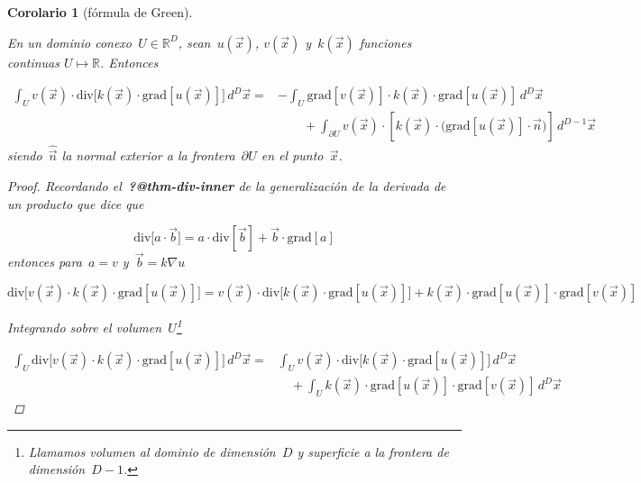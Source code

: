 \documentclass[
  12pt,
  a4paper,
  table]{scrbook}
\theoremstyle{plain}
\theoremstyle{definition}
\theoremstyle{plain}
\theoremstyle{plain}
\newtheorem{corollary}{Corolario}[chapter]
\theoremstyle{remark}
\begin{document}
\begin{corollary}[fórmula de
Green]\protect\hypertarget{cor-green}{}\label{cor-green}

En un dominio conexo~\(U \in \mathbb{R}^D\), sean~\(u(\vec{x})\),
\(v(\vec{x})\) y~\(k(\vec{x})\) funciones continuas
\(U \mapsto \mathbb{R}\). Entonces

\[
\begin{aligned}
\int_U v(\vec{x}) \cdot \mathrm{div} \Big[ k(\vec{x}) \cdot \mathrm{grad} \left[ u(\vec{x}) \right] \Big]  \,d^D\vec{x} =&
-\int_U \mathrm{grad} \left[ v(\vec{x}) \right] \cdot k(\vec{x}) \cdot \mathrm{grad} \left[ u(\vec{x}) \right] \, d^D\vec{x} 
\\
& \quad\quad + \int_{\partial U} v(\vec{x}) \cdot \left[ k(\vec{x}) \cdot \Big( \mathrm{grad}\left[ u(\vec{x}) \right] \cdot \hat{\vec{n}} \Big) \right] \, d^{D-1}\vec{x}
\end{aligned}
\] siendo~\(\hat{\vec{n}}\) la normal exterior a la
frontera~\(\partial U\) en el punto~\(\vec{x}\).

\begin{proof}

Recordando el~\textbf{?@thm-div-inner} de la generalización de la
derivada de un producto que dice que

\[
\text{div} \big[ a \cdot \vec{b} \big ] = a \cdot \text{div} \left[\vec{b}\right] + \vec{b} \cdot \text{grad}\left[a\right]
\] entonces para~\(a = v\) y~\(\vec{b} = k \nabla u\)

\[
\text{div} \Big[ v(\vec{x}) \cdot k(\vec{x}) \cdot \text{grad}\left[ u(\vec{x})\right] \Big] =
v(\vec{x}) \cdot \text{div}\Big[ k(\vec{x}) \cdot \text{grad}\left[ u(\vec{x})\right] \Big] +
k(\vec{x}) \cdot \text{grad}\left[u(\vec{x})\right] \cdot \text{grad}\left[v(\vec{x})\right]
\]

Integrando sobre el volumen~\(U\)\footnote{Llamamos volumen al dominio
  de dimensión~\(D\) y superficie a la frontera de dimensión~\(D-1\).}

\[
\begin{aligned}
\int_U \text{div} \Big[ v(\vec{x}) \cdot k(\vec{x}) \cdot \text{grad}\left[ u(\vec{x})\right] \Big] \, d^D\vec{x} =&
\int_U v(\vec{x}) \cdot \text{div}\Big[ k(\vec{x}) \cdot \text{grad}\left[ u(\vec{x})\right] \Big] \, d^D\vec{x} \\
&\quad +
\int_U k(\vec{x}) \cdot \text{grad}\left[u(\vec{x})\right] \cdot \text{grad}\left[v(\vec{x})\right] \, d^D\vec{x}
\end{aligned}
\]


\end{proof}
\end{corollary}
\end{document}
